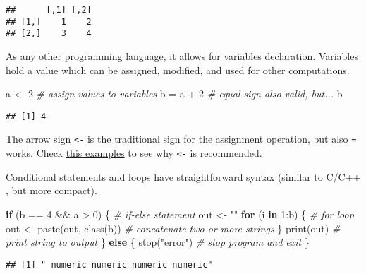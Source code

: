 \documentclass[
  oneside]{book}
\newenvironment{Shaded}{\begin{snugshade}}{\end{snugshade}}
\newcommand{\CommentTok}[1]{\textcolor[rgb]{0.56,0.35,0.01}{\textit{#1}}}
\newcommand{\ControlFlowTok}[1]{\textcolor[rgb]{0.13,0.29,0.53}{\textbf{#1}}}
\newcommand{\DecValTok}[1]{\textcolor[rgb]{0.00,0.00,0.81}{#1}}
\newcommand{\FunctionTok}[1]{\textcolor[rgb]{0.00,0.00,0.00}{#1}}
\newcommand{\NormalTok}[1]{#1}
\newcommand{\OtherTok}[1]{\textcolor[rgb]{0.56,0.35,0.01}{#1}}
\newcommand{\SpecialCharTok}[1]{\textcolor[rgb]{0.00,0.00,0.00}{#1}}
\newcommand{\StringTok}[1]{\textcolor[rgb]{0.31,0.60,0.02}{#1}}
\begin{document}
\begin{verbatim}
##      [,1] [,2]
## [1,]    1    2
## [2,]    3    4
\end{verbatim}

As any other programming language, it allows for variables declaration.
Variables hold a value which can be assigned, modified, and used for
other computations.

\begin{Shaded}
\begin{Highlighting}[]
\NormalTok{a }\OtherTok{\textless{}{-}} \DecValTok{2} \CommentTok{\# assign values to variables}
\NormalTok{b }\OtherTok{=}\NormalTok{ a }\SpecialCharTok{+} \DecValTok{2} \CommentTok{\# equal sign also valid, but...}
\NormalTok{b}
\end{Highlighting}
\end{Shaded}

\begin{verbatim}
## [1] 4
\end{verbatim}

The arrow sign \texttt{\textless{}-} is the traditional sign for the assignment operation,
but also \texttt{=} works. Check \protect\hyperlink{arrow-sign}{this examples} to see why \texttt{\textless{}-}
is recommended.

Conditional statements and loops have straightforward syntax (similar to C/C++
, but more compact).

\begin{Shaded}
\begin{Highlighting}[]
\ControlFlowTok{if}\NormalTok{ (b }\SpecialCharTok{==} \DecValTok{4} \SpecialCharTok{\&\&}\NormalTok{ a }\SpecialCharTok{\textgreater{}} \DecValTok{0}\NormalTok{) \{ }\CommentTok{\# if{-}else statement}
\NormalTok{  out }\OtherTok{\textless{}{-}} \StringTok{""}
  \ControlFlowTok{for}\NormalTok{ (i }\ControlFlowTok{in} \DecValTok{1}\SpecialCharTok{:}\NormalTok{b) \{ }\CommentTok{\# for loop}
\NormalTok{    out }\OtherTok{\textless{}{-}} \FunctionTok{paste}\NormalTok{(out, }\FunctionTok{class}\NormalTok{(b)) }\CommentTok{\# concatenate two or more strings}
\NormalTok{  \}}
  \FunctionTok{print}\NormalTok{(out) }\CommentTok{\# print string to output}
\NormalTok{\} }\ControlFlowTok{else}\NormalTok{ \{}
  \FunctionTok{stop}\NormalTok{(}\StringTok{"error"}\NormalTok{) }\CommentTok{\# stop program and exit}
\NormalTok{\}}
\end{Highlighting}
\end{Shaded}

\begin{verbatim}
## [1] " numeric numeric numeric numeric"
\end{verbatim}
\end{document}
